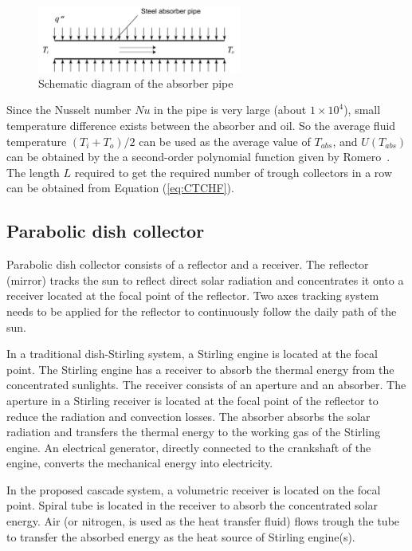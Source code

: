 \begin{figure}[!ht]
\centering
\includegraphics[width=0.6\textwidth]{fig/Pipe.pdf}
\caption{Schematic diagram of the absorber pipe}\label{fig:Pipe}
\end{figure}


Since the Nusselt number $Nu$ in the pipe is very large (about $1\times10^4$), small temperature difference exists between the absorber and oil. So the average fluid temperature $(T_{i}+T_{o})/2$ can be used as the average value of $T_{abs}$, and $U(T_{abs})$ can be obtained by the a second-order polynomial function given by Romero~\cite{Romero2007}. The length $L$ required to get the required number of trough collectors in a row can be obtained from Equation (\ref{eq:CTCHF}).

\subsection{Parabolic dish collector}

Parabolic dish collector consists of a reflector and a receiver. The reflector (mirror) tracks the sun to reflect direct solar radiation and concentrates it onto a receiver located at the focal point of the reflector. Two axes tracking system needs to be applied for the reflector to continuously follow the daily path of the sun.

In a traditional dish-Stirling system, a Stirling engine is located at the focal point. The Stirling engine has a receiver to absorb the thermal energy from the concentrated sunlights. The receiver consists of an aperture and an absorber. The aperture in a Stirling receiver is located at the focal point of the reflector to reduce the radiation and convection losses. The absorber absorbs the solar radiation and transfers the thermal energy to the working gas of the Stirling engine. An electrical generator, directly connected to the crankshaft of the engine, converts the mechanical energy into electricity. 

In the proposed cascade system, a volumetric receiver is located on the focal point. Spiral tube is located in the receiver to absorb the concentrated solar energy. Air (or nitrogen, is used as the heat transfer fluid) flows trough the tube to transfer the absorbed energy as the heat source of Stirling engine(s).

